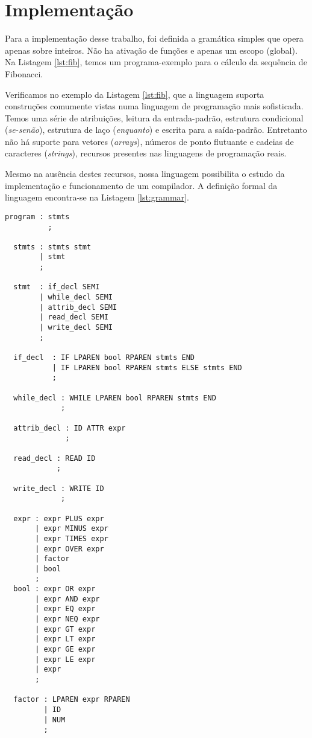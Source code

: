 \section{Implementação}
\label{sec:implementacao}

Para a implementação desse trabalho, foi definida a gramática simples que
opera apenas sobre inteiros. Não ha ativação de funções e apenas um escopo
(global). Na Listagem \ref{lst:fib}, temos um programa-exemplo para o cálculo
da sequência de Fibonacci.



Verificamos no exemplo da Listagem \ref{lst:fib}, que a linguagem suporta
construções comumente vistas numa linguagem de programação mais
sofisticada. Temos uma série de atribuições, leitura da entrada-padrão,
estrutura condicional (\emph{se-senão}), estrutura de laço (\emph{enquanto})
e escrita para a saída-padrão. Entretanto não há suporte para vetores
(\emph{arrays}), números de ponto flutuante e cadeias de caracteres
(\emph{strings}), recursos presentes nas linguagens de programação reais.

Mesmo na ausência destes recursos, nossa linguagem possibilita o estudo da
implementação e funcionamento de um compilador. A definição formal da
linguagem encontra-se na Listagem \ref{lst:grammar}.

\begin{lstlisting}[label=lst:grammar,caption=Gramática reconhecida]
  program : stmts
          ;

  stmts : stmts stmt
        | stmt
        ;

  stmt  : if_decl SEMI
        | while_decl SEMI
        | attrib_decl SEMI
        | read_decl SEMI
        | write_decl SEMI
        ;

  if_decl  : IF LPAREN bool RPAREN stmts END
           | IF LPAREN bool RPAREN stmts ELSE stmts END
           ;

  while_decl : WHILE LPAREN bool RPAREN stmts END
             ;

  attrib_decl : ID ATTR expr
              ;

  read_decl : READ ID
            ;

  write_decl : WRITE ID
             ;

  expr : expr PLUS expr
       | expr MINUS expr
       | expr TIMES expr
       | expr OVER expr
       | factor
       | bool
       ;
  bool : expr OR expr
       | expr AND expr
       | expr EQ expr
       | expr NEQ expr
       | expr GT expr
       | expr LT expr
       | expr GE expr
       | expr LE expr
       | expr
       ;

  factor : LPAREN expr RPAREN
         | ID
         | NUM
         ;
\end{lstlisting}


